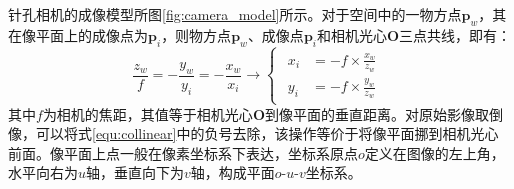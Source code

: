 针孔相机的成像模型所图\ref{fig:camera_model}所示。对于空间中的一物方点$\boldsymbol{p}_w$，其在像平面上的成像点为$\boldsymbol{p}_i$，则物方点$\boldsymbol{p}_w$、成像点$\boldsymbol{p}_i$和相机光心$\boldsymbol{O}$三点共线，即有：
\begin{equation}
  \label{equ:collinear}
  \frac{z_w}{f}=-\frac{y_w}{y_i}=-\frac{x_w}{x_i}\to
  \begin{cases}
    \begin{aligned}
      x_i & =-f\times\frac{x_w}{z_w} \\
      y_i & =-f\times\frac{y_w}{z_w}
    \end{aligned}
  \end{cases}
\end{equation}
其中$f$为相机的焦距，其值等于相机光心$\boldsymbol{O}$到像平面的垂直距离。对原始影像取倒像，可以将式\ref{equ:collinear}中的负号去除，该操作等价于将像平面挪到相机光心前面。像平面上点一般在像素坐标系下表达，坐标系原点$o$定义在图像的左上角，水平向右为$u$轴，垂直向下为$v$轴，构成平面$o$-$u$-$v$坐标系。

